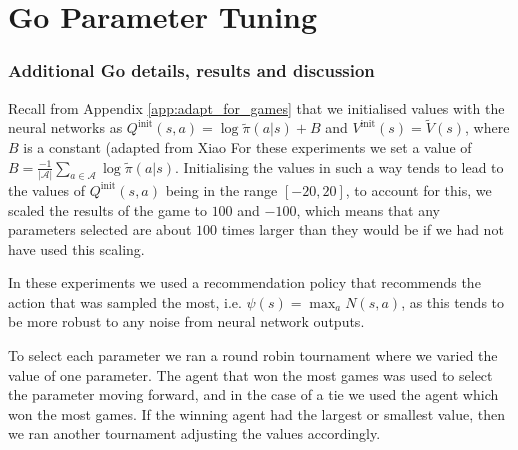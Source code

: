 %

\chapter{\label{app:go-results}Go Parameter Tuning}



\subsection{Additional Go details, results and discussion} \label{app:go_results}
    Recall from Appendix \ref{app:adapt_for_games} that we initialised values with the neural networks as $Q^{\text{init}}(s,a)=\log \tilde{\pi}(a|s)+B$ and $V^{\text{init}}(s)=\tilde{V}(s)$, where $B$ is a constant (adapted from Xiao  %
    For these experiments we set a value of $B=\frac{-1}{|\mathcal{A}|}\sum_{a\in\mathcal{A}} \log\tilde{\pi}(a|s)$. Initialising the values in such a way tends to lead to the values of $Q^{\text{init}}(s,a)$ being in the range $[-20,20]$, to account for this, we scaled the results of the game to $100$ and $-100$, which means that any parameters selected are about $100$ times larger than they would be if we had not have used this scaling.
    
    In these experiments we used a recommendation policy that recommends the action that was sampled the most, i.e. $\psi(s)=\max_a N(s,a)$, as this tends to be more robust to any noise from neural network outputs.
    
    To select each parameter we ran a round robin tournament where we varied the value of one parameter. The agent that won the most games was used to select the parameter moving forward, and in the case of a tie we used the agent which won the most games. If the winning agent had the largest or smallest value, then we ran another tournament adjusting the values accordingly.
    
